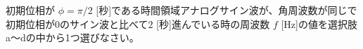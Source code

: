初期位相が $\phi=\pi/2$ [秒]である時間領域アナログサイン波が、角周波数が同じで初期位相が$0$のサイン波と比べて$2$ [秒]進んでいる時の周波数 $f$ [Hz]の値を選択肢a〜dの中から1つ選びなさい。
